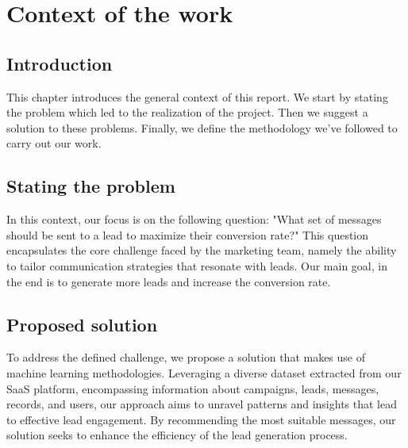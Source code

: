 \chapter{Context of the work}
\minitoc
\newpage

\setcounter{secnumdepth}{0} %
\section{Introduction}
This chapter introduces the general context of this report. We start by
stating the problem which led to the realization of the project. Then we suggest a solution to these problems. Finally, we define the methodology we've followed to carry out our work.

\setcounter{secnumdepth}{2} %
\section{Stating the problem}
In this context, our focus is on the following question: "What set of messages should be sent to a lead to maximize their conversion rate?" This question encapsulates the core challenge faced by the marketing team, namely the ability to tailor communication strategies that resonate with leads. Our main goal, in the end is to generate more leads and increase the conversion rate.

\section{Proposed solution}
To address the defined challenge, we propose a solution that makes use of machine learning methodologies. Leveraging a diverse dataset extracted from our SaaS platform, encompassing information about campaigns, leads, messages, records, and users, our approach aims to unravel patterns and insights that lead to effective lead engagement. By recommending the most suitable messages, our solution seeks to enhance the efficiency of the lead generation process.


